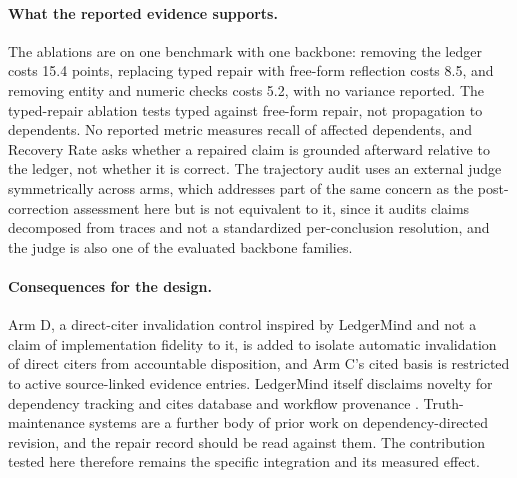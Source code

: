 \documentclass[11pt]{article}
\begin{document}
\paragraph{What the reported evidence supports.} The ablations are on one benchmark with one backbone: removing the ledger costs 15.4 points, replacing typed repair with free-form reflection costs 8.5, and removing entity and numeric checks costs 5.2, with no variance reported. The typed-repair ablation tests typed against free-form repair, not propagation to dependents. No reported metric measures recall of affected dependents, and Recovery Rate asks whether a repaired claim is grounded afterward relative to the ledger, not whether it is correct. The trajectory audit uses an external judge symmetrically across arms, which addresses part of the same concern as the post-correction assessment here but is not equivalent to it, since it audits claims decomposed from traces and not a standardized per-conclusion resolution, and the judge is also one of the evaluated backbone families.

\paragraph{Consequences for the design.} Arm D, a direct-citer invalidation control inspired by LedgerMind and not a claim of implementation fidelity to it, is added to isolate automatic invalidation of direct citers from accountable disposition, and Arm C's cited basis is restricted to active source-linked evidence entries. LedgerMind itself disclaims novelty for dependency tracking and cites database and workflow provenance \cite{buneman2001,moreau2011}. Truth-maintenance systems \cite{doyle1979tms,dekleer1986atms} are a further body of prior work on dependency-directed revision, and the repair record should be read against them. The contribution tested here therefore remains the specific integration and its measured effect.
\end{document}
